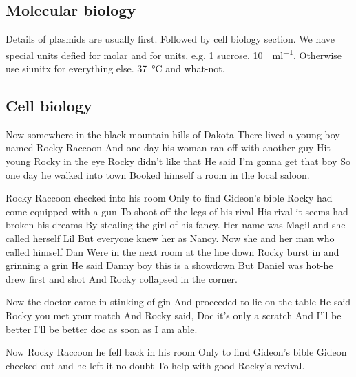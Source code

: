 \documentclass[vruler,JCS]{COB}
\begin{document}
\subsection{Molecular biology}

Details of plasmids are usually first.
Followed by cell biology section.
We have special units defied for molar and for units, e.g. \SI{1}{\Molar} sucrose, \SI{10}{\Units\per\milli\litre}.
Otherwise use siunitx for everything else. \SI{37}{\degreeCelsius} and what-not.

\subsection{Cell biology}

Now somewhere in the black mountain hills of Dakota
There lived a young boy named Rocky Raccoon
And one day his woman ran off with another guy
Hit young Rocky in the eye Rocky didn't like that
He said I'm gonna get that boy
So one day he walked into town
Booked himself a room in the local saloon.

Rocky Raccoon checked into his room
Only to find Gideon's bible
Rocky had come equipped with a gun
To shoot off the legs of his rival
His rival it seems had broken his dreams
By stealing the girl of his fancy.
Her name was Magil and she called herself Lil
But everyone knew her as Nancy.
Now she and her man who called himself Dan
Were in the next room at the hoe down
Rocky burst in and grinning a grin
He said Danny boy this is a showdown
But Daniel was hot-he drew first and shot
And Rocky collapsed in the corner.

Now the doctor came in stinking of gin
And proceeded to lie on the table
He said Rocky you met your match
And Rocky said, Doc it's only a scratch
And I'll be better I'll be better doc as soon as I am able.

Now Rocky Raccoon he fell back in his room
Only to find Gideon's bible
Gideon checked out and he left it no doubt
To help with good Rocky's revival.






\end{document}
